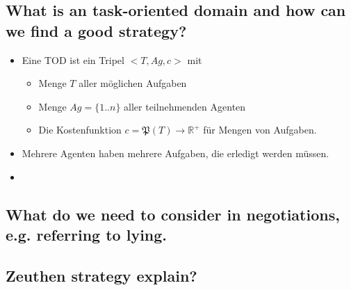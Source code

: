 \subsection{What is an task-oriented domain and how can we find a good strategy?}
\begin{itemize}
	\item Eine TOD ist ein Tripel $<T,Ag,c>$ mit \begin{itemize}
		\item Menge $T$ aller möglichen Aufgaben
		\item Menge $Ag=\{1..n\}$ aller teilnehmenden Agenten
		\item Die Kostenfunktion $c = \mathfrak{P}(T)\rightarrow\mathbb{R}^+$ für Mengen von Aufgaben.
	\end{itemize}
	\item Mehrere Agenten haben mehrere Aufgaben, die erledigt werden müssen.
	\item 
\end{itemize}
\subsection{What do we need to consider in negotiations, e.g. referring to lying.}
\subsection{Zeuthen strategy explain?}
